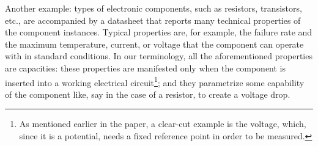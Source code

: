 \documentclass[sw]{iosart2x}
\newcommand{\myComment}[1]{{\unskip \ignorespaces}}
\begin{document}
Another example: types of electronic components, such as resistors, transistors, etc., are accompanied by a datasheet that reports many technical properties of the component instances. 
Typical properties are, for example, the failure rate and the maximum temperature, current, or voltage that the component can operate with in standard conditions. 
In our terminology, all the aforementioned properties are capacities: these properties are manifested only when the component is inserted into a working electrical circuit\footnote{As mentioned earlier in the paper, a clear-cut example is the voltage, which, since it is a potential, needs a fixed reference point in order to be measured.}; and they \myComment{quantify} parametrize some capability of the component like, say in the case of a resistor, to create a voltage drop. 
\end{document}
